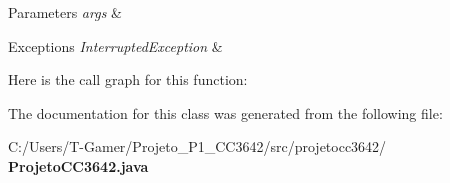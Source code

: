 \begin{DoxyParams}{Parameters}
{\em args} & \\
\hline
\end{DoxyParams}

\begin{DoxyExceptions}{Exceptions}
{\em Interrupted\+Exception} & \\
\hline
\end{DoxyExceptions}
Here is the call graph for this function\+:


The documentation for this class was generated from the following file\+:\begin{DoxyCompactItemize}
\item 
C\+:/\+Users/\+T-\/\+Gamer/\+Projeto\+\_\+\+P1\+\_\+\+C\+C3642/src/projetocc3642/\textbf{ Projeto\+C\+C3642.\+java}\end{DoxyCompactItemize}
